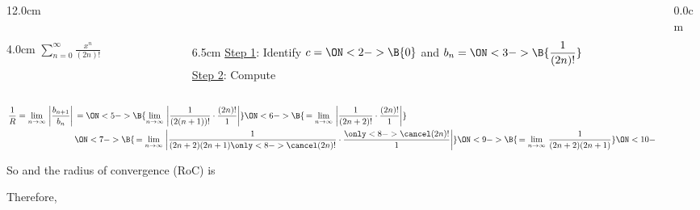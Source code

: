 \begin{frame}
\frametitle{}
\scriptsize

\vspace{0.2cm}

\begin{columns}
\begin{column}{12.0cm}

\begin{columns}
\begin{column}{4.0cm}
	$\displaystyle{\sum \limits_{n=0}^{\infty} \frac{x^n}{(2n)!}}$
\end{column}
\begin{column}{6.5cm}
	\underline{Step 1}: Identify \quad $c = \ON<2->{\B{0}}$ \quad and \quad $\displaystyle{b_{n} = \ON<3->{\B{\frac{1}{(2n)!}}}}$ \\
	\underline{Step 2}: Compute \\
\end{column}
\end{columns}

\vspace{0.2cm}

\begin{align*}
	\frac{1}{R} = \lim \limits_{n \to \infty}\, \left|\frac{b_{n+1}}{b_{n}} \right|	&\,=
	\ON<5->{\B{\lim \limits_{n \to \infty}\, \left|\frac{1}{(2(n+1))!}\cdot\frac{(2n)!}{1}\right|}}
	\ON<6->{\B{\, =\lim \limits_{n \to \infty}\, \left|\frac{1}{(2n+2)!}\cdot\frac{(2n)!}{1}\right|}} \\
	&\,\ON<7->{\B{\, =\lim \limits_{n \to \infty}\, \left|\frac{1}{(2n+2)(2n+1)\only<8->{\cancel}{(2n)!}}\cdot\frac{\only<8->{\cancel}{(2n)!}}{1}\right|}}
	\ON<9->{\B{\, =\lim \limits_{n \to \infty}\,\frac{1}{(2n+2)(2n+1)}}} 
	\ON<10->{\B{\,= 0}}
\end{align*}

\vspace{0.2cm}

So \quad {} \quad and the radius of convergence (RoC) is \quad {}  \\

\vspace{0.4cm}

Therefore, 

\vspace{5.5cm}

\end{column}
\begin{column}{0.0cm}
	
\end{column}
\end{columns}
\end{frame}

